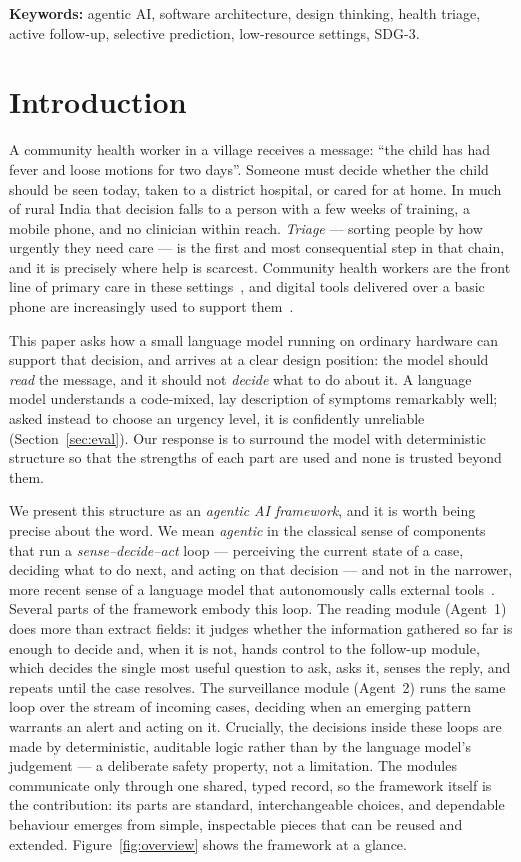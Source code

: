 \documentclass[11pt]{article}
\begin{document}
\noindent\textbf{Keywords:} agentic AI, software architecture, design thinking, health triage,
active follow-up, selective prediction, low-resource settings, SDG-3.

\section{Introduction}
\label{sec:intro}
A community health worker in a village receives a message: ``the child has had fever and loose motions
for two days''. Someone must decide whether the child should be seen today, taken to a district
hospital, or cared for at home. In much of rural India that decision falls to a person with a few weeks
of training, a mobile phone, and no clinician within reach. \emph{Triage} --- sorting people by how
urgently they need care --- is the first and most consequential step in that chain, and it is precisely
where help is scarcest. Community health workers are the front line of primary care in these
settings~\cite{lewin}, and digital tools delivered over a basic phone are increasingly used to support
them~\cite{whodigital}.

This paper asks how a small language model running on ordinary hardware can support that decision, and
arrives at a clear design position: the model should \emph{read} the message, and it should not
\emph{decide} what to do about it. A language model understands a code-mixed, lay description of
symptoms remarkably well; asked instead to choose an urgency level, it is confidently unreliable
(Section~\ref{sec:eval}). Our response is to surround the model with deterministic structure so that
the strengths of each part are used and none is trusted beyond them.

We present this structure as an \emph{agentic AI framework}, and it is worth being precise about the
word. We mean \emph{agentic} in the classical sense of components that run a \emph{sense--decide--act}
loop --- perceiving the current state of a case, deciding what to do next, and acting on that decision
--- and not in the narrower, more recent sense of a language model that autonomously calls external
tools~\cite{react,toolformer,agentsurvey}. Several parts of the framework embody this loop. The reading module (Agent~1) does more than
extract fields: it judges whether the information gathered so far is enough to decide and, when it is
not, hands control to the follow-up module, which decides the single most useful question to ask, asks
it, senses the reply, and repeats until the case resolves. The surveillance module (Agent~2) runs the
same loop over the stream of incoming cases, deciding when an emerging pattern warrants an alert and
acting on it. Crucially, the decisions inside these loops are made by deterministic, auditable logic
rather than by the language model's judgement --- a deliberate safety property, not a limitation. The
modules communicate only through one shared, typed record, so the framework itself is the contribution:
its parts are standard, interchangeable choices, and dependable behaviour emerges from simple,
inspectable pieces that can be reused and extended. Figure~\ref{fig:overview} shows the framework at a
glance.
\end{document}
